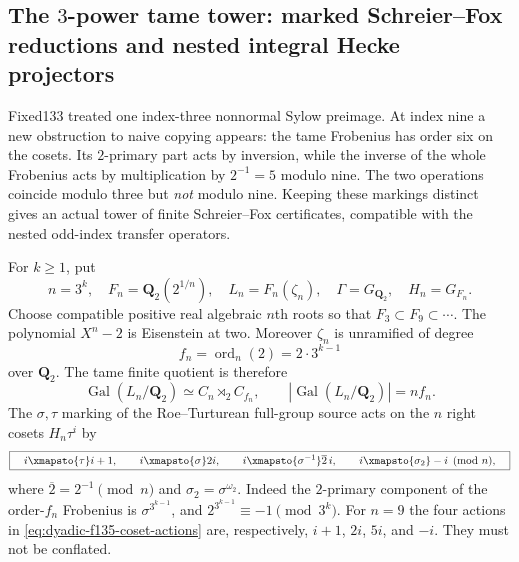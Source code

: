 %

\subsection{The $3$-power tame tower: marked Schreier--Fox
reductions and nested integral Hecke projectors}
\label{subsec:dyadic-f135-threepower-tower}

Fixed133 treated one index-three nonnormal Sylow preimage.
At index nine a new obstruction to naive copying appears:
the tame Frobenius has order six on the cosets.
Its $2$-primary part acts by inversion, while
the inverse of the whole Frobenius acts by
multiplication by $2^{-1}=5$ modulo nine.
The two operations coincide modulo three but
\emph{not} modulo nine.
Keeping these markings distinct gives an
actual tower of finite Schreier--Fox
certificates, compatible with the
nested odd-index transfer operators.

For $k\ge1$, put
\begin{equation}\label{eq:dyadic-f135-tower-fields}
n=3^k,\quad
F_n=\mathbf Q_2(2^{1/n}),\quad
L_n=F_n(\zeta_n),\quad
\Gamma=G_{\mathbf Q_2},\quad H_n=G_{F_n}.
\end{equation}
Choose compatible positive real algebraic
$n$th roots so that $F_3\subset F_9\subset\cdots$.
The polynomial $X^n-2$ is Eisenstein at two.
Moreover $\zeta_n$ is unramified of degree
\[
f_n=\operatorname{ord}_n(2)=2\cdot3^{k-1}
\]
over $\mathbf Q_2$.  The tame finite quotient
is therefore
\begin{equation}\label{eq:dyadic-f135-tame-quotient}
\operatorname{Gal}(L_n/\mathbf Q_2)
\simeq C_n\rtimes_{2} C_{f_n},\qquad
|\operatorname{Gal}(L_n/\mathbf Q_2)|=nf_n.
\end{equation}
The $\sigma,\tau$ marking of the
Roe--Turturean full-group source
\cite{RoeTurtureanGQ2} acts on the
$n$ right cosets $H_n\tau^i$ by
\begin{equation}\label{eq:dyadic-f135-coset-actions}
\boxed{\quad
i\xmapsto{\tau}i+1,\qquad
i\xmapsto{\sigma}2i,\qquad
i\xmapsto{\sigma^{-1}}\overline2\,i,
\qquad
i\xmapsto{\sigma_2}-i
\pmod n,
\quad}
\end{equation}
where $\overline2=2^{-1}\pmod n$ and
$\sigma_2=\sigma^{\omega_2}$.
Indeed the $2$-primary component of
the order-$f_n$ Frobenius is
$\sigma^{3^{k-1}}$, and
$2^{3^{k-1}}\equiv-1\pmod{3^k}$.
For $n=9$ the four actions in
\eqref{eq:dyadic-f135-coset-actions}
are, respectively,
$i+1$, $2i$, $5i$, and $-i$.
They must not be conflated.

